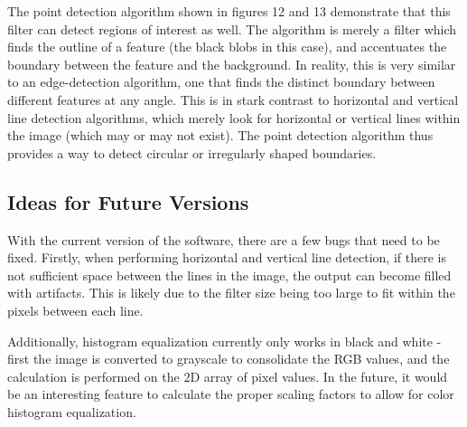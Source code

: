 \documentclass{article}
\let\Oldsubsection\subsection
\renewcommand{\subsection}{\FloatBarrier\Oldsubsection}
\begin{document}
  The point detection algorithm shown in figures 12 and 13 demonstrate that this filter can detect regions of interest as well. The algorithm is merely a filter which finds the outline of a feature (the black blobs in this case), and accentuates the boundary between the feature and the background. In reality, this is very similar to an edge-detection algorithm, one that finds the distinct boundary between different features at any angle. This is in stark contrast to horizontal and vertical line detection algorithms, which merely look for horizontal or vertical lines within the image (which may or may not exist). The point detection algorithm thus provides a way to detect circular or irregularly shaped boundaries.

  \subsection{Ideas for Future Versions}

  With the current version of the software, there are a few bugs that need to be fixed. Firstly, when performing horizontal and vertical line detection, if there is not sufficient space between the lines in the image, the output can become filled with artifacts. This is likely due to the filter size being too large to fit within the pixels between each line.

  Additionally, histogram equalization currently only works in black and white - first the image is converted to grayscale to consolidate the RGB values, and the calculation is performed on the 2D array of pixel values. In the future, it would be an interesting feature to calculate the proper scaling factors to allow for color histogram equalization.
  
  \newpage

  \printbibliography

  
\end{document}
